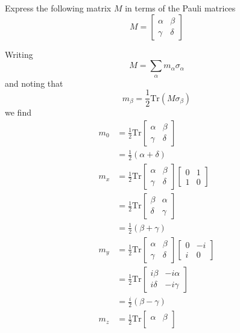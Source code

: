 \documentclass[../principles-of-quantum-mechanics.tex]{subfiles}
\begin{document}
\begin{questions}
		\question Express the following matrix $M$ in terms of the Pauli matrices
		$$M = \begin{bmatrix}
			\alpha & \beta \\
			\gamma & \delta
		\end{bmatrix}$$
	
		\begin{solution}
			Writing
			$$M = \sum_\alpha m_\alpha\sigma_\alpha$$
			and noting that
			$$m_\beta = \frac{1}{2}\mathrm{Tr}(M\sigma_\beta)$$
			we find
			\begin{align*}
				m_0 &= \frac{1}{2}\mathrm{Tr}\begin{bmatrix}
					\alpha & \beta \\
					\gamma & \delta
				\end{bmatrix} \\
				&= \frac{1}{2}(\alpha + \delta) \\
				m_x &= \frac{1}{2}\mathrm{Tr}\begin{bmatrix}
					\alpha & \beta \\
					\gamma & \delta
				\end{bmatrix}\begin{bmatrix}0 & 1 \\ 1 & 0\end{bmatrix} \\
				&= \frac{1}{2}\mathrm{Tr}\begin{bmatrix}\beta & \alpha \\ \delta & \gamma\end{bmatrix} \\
				&= \frac{1}{2}(\beta + \gamma) \\
				m_y &= \frac{1}{2}\mathrm{Tr}\begin{bmatrix}
					\alpha & \beta \\
					\gamma & \delta
				\end{bmatrix}\begin{bmatrix}0 & -i \\ i & 0\end{bmatrix} \\
				&= \frac{1}{2}\mathrm{Tr}\begin{bmatrix}i\beta & -i\alpha \\ i\delta & -i\gamma\end{bmatrix} \\
				&= \frac{i}{2}(\beta - \gamma) \\
				m_z &= \frac{1}{2}\mathrm{Tr}\begin{bmatrix}
					\alpha & \beta \\

\end{bmatrix}
\end{align*}
\end{solution}
\end{questions}
\end{document}
